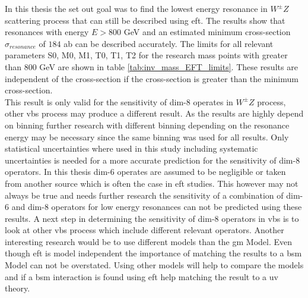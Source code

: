 \documentclass[../Bachelorarbeit.tex]{subfiles}
\begin{document}
\label{sec:summery}
In this thesis the set out goal was to find the lowest energy resonance in $W^{\pm}Z$ scattering process that can still be described using \acrshort{eft}.
The results show that resonances with energy $E>800$ GeV and an estimated minimum cross-section $\sigma_{resonance}$ of $184$ ab can be described accurately.
The limits for all relevant parameters S0, M0, M1, T0, T1, T2 for the research mass points with greater than 800 GeV are shown in table \ref{tab:inv_mass_EFT_limits}.
These results are independent of the cross-section if the cross-section is greater than the minimum cross-section.\\
This result is only valid for the sensitivity of dim-8 operates in $W^{\pm}Z$ process, other \acrshort{vbs} process may produce a different result.
As the results are highly depend on binning further research with different binning depending on the resonance energy may be necessary since the same binning was used for all results.
Only statistical uncertainties where used in this study including systematic uncertainties is needed for a more accurate prediction for the sensitivity of dim-8 operators.
In this thesis dim-6 operates are assumed to be negligible or taken from another source which is often the case in \acrshort{eft} studies.
This however may not always be true and needs further research the sensitivity of a combination of dim-6 and dim-8 operators for low energy resonances can not be predicted using these results.
A next step in determining the sensitivity of dim-8 operators in \acrshort{vbs} is to look at other \acrshort{vbs} process which include different relevant operators.
Another interesting research would be to use different models than the \acrshort{gm} Model. Even though \acrshort{eft} is model independent the importance of matching the results to a \acrshort{bsm} Model can not be overstated.
Using other models will help to compare the models and if a \acrshort{bsm} interaction is found using \acrshort{eft} help matching the result to a \acrshort{uv} theory.
\end{document}
